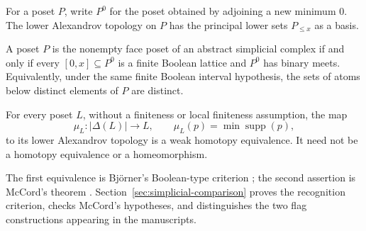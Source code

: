 For a poset $P$, write $P^0$ for the poset obtained by adjoining a new
minimum $0$. The lower Alexandrov topology on $P$ has the principal
lower sets $P_{\le x}$ as a basis.

\begin{theorem}
\label{thm:simplicial-comparison}
A poset $P$ is the nonempty face poset of an abstract simplicial
complex if and only if every $[0,x]\subseteq P^0$ is a finite Boolean
lattice and $P^0$ has binary meets. Equivalently, under the same
finite Boolean interval hypothesis, the sets of atoms below distinct
elements of $P$ are distinct.

For every poset $L$, without a finiteness or local finiteness
assumption, the map
\[
 \mu_L:|\Delta(L)|\longrightarrow L,\qquad
 \mu_L(p)=\min\operatorname{supp}(p),
\]
to its lower Alexandrov topology is a weak homotopy equivalence.
It need not be a homotopy equivalence or a homeomorphism.
\end{theorem}
The first equivalence is Bj\"orner's Boolean-type criterion
\cite[Section~2.3, pp.~8--9]{Bjorner}; the second assertion is
McCord's theorem \cite[Theorem~2, p.~466; Section~5, p.~469]{McCord}.
Section~\ref{sec:simplicial-comparison} proves the recognition
criterion, checks McCord's hypotheses, and distinguishes the two
flag constructions appearing in the manuscripts.
